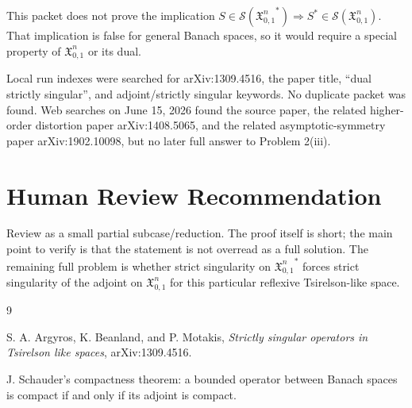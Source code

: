 \documentclass[11pt]{article}
\newcommand{\X}{\mathfrak{X}_{0,1}^{n}}
\newcommand{\SSing}{\mathcal{S}}
\begin{document}
This packet does not prove the implication
$S\in\SSing({\X}^*)\Rightarrow S^*\in\SSing(\X)$.  That implication is false for
general Banach spaces, so it would require a special property of
$\mathfrak X_{0,1}^n$ or its dual.

Local run indexes were searched for arXiv:1309.4516, the paper title,
``dual strictly singular'', and adjoint/strictly singular keywords.  No
duplicate packet was found.  Web searches on June 15, 2026 found the source
paper, the related higher-order distortion paper arXiv:1408.5065, and the
related asymptotic-symmetry paper arXiv:1902.10098, but no later full answer
to Problem 2(iii).

\section*{Human Review Recommendation}

Review as a small partial subcase/reduction.  The proof itself is short; the
main point to verify is that the statement is not overread as a full solution.
The remaining full problem is whether strict singularity on ${\X}^*$ forces
strict singularity of the adjoint on $\X$ for this particular reflexive
Tsirelson-like space.

\begin{thebibliography}{9}

S. A. Argyros, K. Beanland, and P. Motakis,
\emph{Strictly singular operators in Tsirelson like spaces},
arXiv:1309.4516.

J. Schauder's compactness theorem: a bounded operator between Banach spaces is
compact if and only if its adjoint is compact.

\end{thebibliography}
\end{document}
